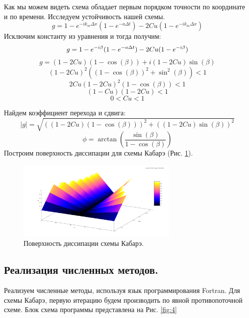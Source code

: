 Как мы можем видеть схема обладает первым порядком точности по координате и по времени. Исследуем устойчивость нашей схемы. 
\begin{equation}
    g=1-e^{-ik_m\Delta x}(1-e^{-a\Delta t})-2Cu(1-e^{-ik_m\Delta x})
\end{equation}
Исключим константу из уравнения и тогда получим:
\begin{equation}
    g=1-e^{-i\beta}(1-e^{-a\Delta t})-2Cu(1-e^{-i\beta})\\
\end{equation}
$$g=(1-2Cu)(1-\cos(\beta))+i(1-2Cu)\sin(\beta)$$
\begin{equation}
    (1-2Cu)^2((1-\cos(\beta))^2+\sin^2(\beta))<1
\end{equation}
\begin{equation}
    2Cu(1-2Cu)^2(1-\cos(\beta))<1
\end{equation}
\begin{equation}
    (1-Cu)(1-2Cu)<1
\end{equation}
\begin{equation}
    0<Cu<1
\end{equation}

Найдем коэффициент перехода и сдвига:
$$|g|=\sqrt{((1-2Cu)(1-\cos(\beta)))^2+((1-2Cu)\sin(\beta))^2}$$
$$\phi=\arctan(\frac{\sin(\beta)}{1-\cos(\beta)})$$
Построим поверхность диссипации для схемы Кабарэ (Рис. \ref{fig:13}). 

\begin{figure}[H]
    \centering
    \includegraphics[width=0.7\textwidth]{images/15.png}
    \caption{Поверхность диссипации схемы Кабарэ.}
    \label{fig:13}
\end{figure}

\subsection{Реализация численных методов.}
Реализуем численные методы, используя язык программирования Fortran. Для схемы Кабарэ, первую итерацию будем производить по явной противопоточной схеме. Блок схема программы представлена на Рис. \ref{fig:4}
